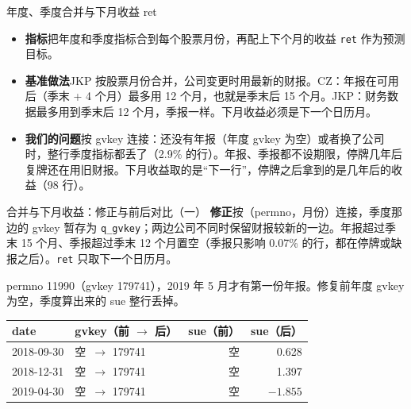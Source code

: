 \documentclass[UTF8,fontset=fandol,aspectratio=169,10pt,t]{ctexbeamer}
\newcommand{\chg}[1]{\textcolor{red!80!black}{#1}}
\newcommand{\kong}{空}
\newcommand{\code}[1]{\texttt{#1}}
\newcommand{\lab}[1]{\textbf{#1}\quad}
\newcommand{\tsize}{\small}
\newcommand{\src}[1]{{\footnotesize\color{black!60}#1}}
\begin{document}
\begin{frame}{年度、季度合并与下月收益 ret}
\begin{itemize}
\item \lab{指标}把年度和季度指标合到每个股票月份，再配上下个月的收益 \code{ret} 作为预测目标。
\item \lab{基准做法}JKP 按股票月份合并，公司变更时用最新的财报。CZ：年报在可用后（季末 + 4 个月）最多用 12 个月，也就是季末后 15 个月。JKP：财务数据最多用到季末后 12 个月，季报一样。下月收益必须是下一个日历月。
\item \lab{我们的问题}按 gvkey 连接：还没有年报（年度 gvkey 为空）或者换了公司时，整行季度指标都丢了（2.9\% 的行）。年报、季报都不设期限，停牌几年后复牌还在用旧财报。下月收益取的是“下一行”，停牌之后拿到的是几年后的收益（98 行）。
\end{itemize}
\end{frame}

\begin{frame}{合并与下月收益：修正与前后对比（一）}
\lab{修正}按（permno，月份）连接，季度那边的 gvkey 暂存为 \code{q\_gvkey}；两边公司不同时保留财报较新的一边。年报超过季末 15 个月、季报超过季末 12 个月置空（季报只影响 0.07\% 的行，都在停牌或缺报之后）。\code{ret} 只取下一个日历月。\par\medskip
\src{permno 11990（gvkey 179741），2019 年 5 月才有第一份年报。修复前年度 gvkey 为空，季度算出来的 sue 整行丢掉。}\par\smallskip
{\tsize
\begin{tabular}{l l rr}
\toprule
date & gvkey（前 $\to$ 后） & sue（前） & sue（后） \\
\midrule
2018-09-30 & \kong\ $\to$ 179741 & \kong & \chg{0.628} \\
2018-12-31 & \kong\ $\to$ 179741 & \kong & \chg{1.397} \\
2019-04-30 & \kong\ $\to$ 179741 & \kong & \chg{$-1.855$} \\
\bottomrule
\end{tabular}}
\end{frame}
\end{document}
